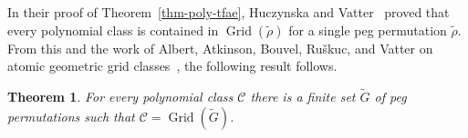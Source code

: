 \documentclass[10pt]{article}
\newcounter{todocounter}
\newcommand{\todo}[1]{
	\addtocounter{todocounter}{1}
	\bigskip
	\noindent{\bf $\ll$ To-do \#\arabic{todocounter}:\rule{10pt}{0pt}#1 $\gg$}\bigskip
}
\theoremstyle{plain}
\newtheorem{theorem}{Theorem}[section]
\newtheorem{corollary}[theorem]{Corollary}
\theoremstyle{definition}
\newcommand{\C}{\mathcal{C}}
\newcommand{\Grid}{\operatorname{Grid}}
\newcommand{\p}[1]{#1^+}
\newcommand{\m}[1]{#1^-}
\renewcommand{\d}[1]{#1^{\bullet}}
\begin{document}
In their proof of Theorem~\ref{thm-poly-tfae}, Huczynska and Vatter~\cite{huczynska:grid-classes-an:} proved that every polynomial class is contained in $\Grid(\tilde{\rho})$ for a single peg permutation $\tilde{\rho}$. From this and the work of Albert, Atkinson, Bouvel, Ru\v{s}kuc, and Vatter on atomic geometric grid classes~\cite[Theorem 10.3]{albert:geometric-grid-:}, the following result follows.

\begin{theorem}
\label{thm-poly-grids}
For every polynomial class $\C$ there is a finite set $\tilde{G}$ of peg permutations such that $\C=\Grid(\tilde{G})$.	
\end{theorem}

%


\end{document}
